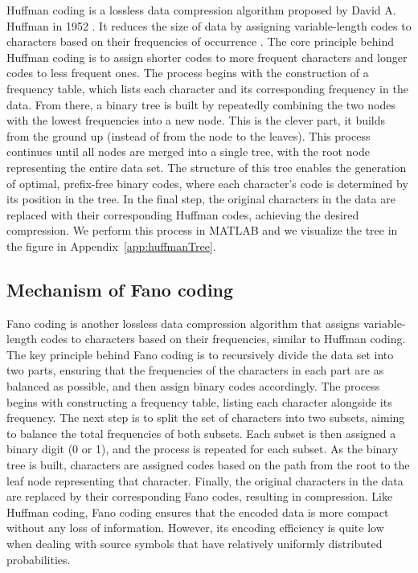 \documentclass[12pt,twoside]{article}
\begin{document}
Huffman coding is a lossless data compression algorithm proposed by David A. Huffman in 1952 \cite{ref1}. It reduces the size of data by assigning variable-length codes to characters based on their frequencies of occurrence \cite{ref2, ref3}. The core principle behind Huffman coding is to assign shorter codes to more frequent characters and longer codes to less frequent ones. The process begins with the construction of a frequency table, which lists each character and its corresponding frequency in the data. From there, a binary tree is built by repeatedly combining the two nodes with the lowest frequencies into a new node. This is the clever part, it builds from the ground up (instead of from the node to the leaves). This process continues until all nodes are merged into a single tree, with the root node representing the entire data set. The structure of this tree enables the generation of optimal, prefix-free binary codes, where each character's code is determined by its position in the tree. In the final step, the original characters in the data are replaced with their corresponding Huffman codes, achieving the desired compression. We perform this process in MATLAB and we visualize the tree in the figure in Appendix~\ref{app:huffmanTree}.

\subsection{Mechanism of Fano coding}
\label{sec:fano}

Fano coding is another lossless data compression algorithm that assigns variable-length codes to characters based on their frequencies, similar to Huffman coding. The key principle behind Fano coding is to recursively divide the data set into two parts, ensuring that the frequencies of the characters in each part are as balanced as possible, and then assign binary codes accordingly. The process begins with constructing a frequency table, listing each character alongside its frequency. The next step is to split the set of characters into two subsets, aiming to balance the total frequencies of both subsets. Each subset is then assigned a binary digit (0 or 1), and the process is repeated for each subset. As the binary tree is built, characters are assigned codes based on the path from the root to the leaf node representing that character. Finally, the original characters in the data are replaced by their corresponding Fano codes, resulting in compression. Like Huffman coding, Fano coding ensures that the encoded data is more compact without any loss of information. However, its encoding efficiency is quite low when dealing with source symbols that have relatively uniformly distributed probabilities.
\end{document}
